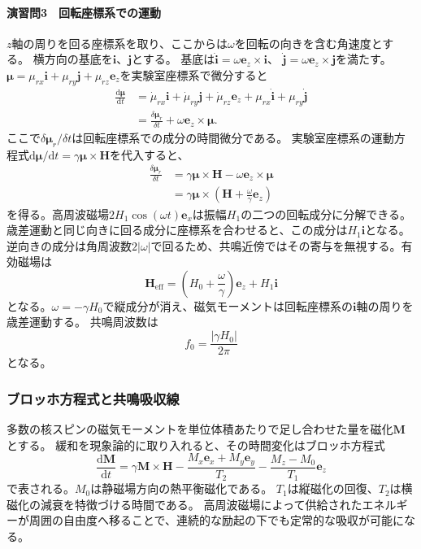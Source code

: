 \documentclass[dvipdfmx,a4paper,11pt]{jsarticle}
\begin{document}
\paragraph{演習問3　回転座標系での運動}
$z$軸の周りを回る座標系を取り、ここからは$\omega$を回転の向きを含む角速度とする。
横方向の基底を$\boldsymbol{i}$、$\boldsymbol{j}$とする。
基底は$\dot{\boldsymbol{i}}=\omega\boldsymbol{e}_z\times\boldsymbol{i}$、
$\dot{\boldsymbol{j}}=\omega\boldsymbol{e}_z\times\boldsymbol{j}$を満たす。
$\boldsymbol{\mu}=\mu_{rx}\boldsymbol{i}+\mu_{ry}\boldsymbol{j}+\mu_{rz}\boldsymbol{e}_z$を実験室座標系で微分すると
\begin{align}
 \frac{\mathrm{d}\boldsymbol{\mu}}{\mathrm{d}t}
 &=\dot{\mu}_{rx}\boldsymbol{i}+\dot{\mu}_{ry}\boldsymbol{j}
   +\dot{\mu}_{rz}\boldsymbol{e}_z
   +\mu_{rx}\dot{\boldsymbol{i}}+\mu_{ry}\dot{\boldsymbol{j}}\\
 &=\frac{\delta\boldsymbol{\mu}_r}{\delta t}
   +\omega\boldsymbol{e}_z\times\boldsymbol{\mu}.
\end{align}
ここで$\delta\boldsymbol{\mu}_r/\delta t$は回転座標系での成分の時間微分である。
実験室座標系の運動方程式$\mathrm{d}\boldsymbol{\mu}/\mathrm{d}t
=\gamma\boldsymbol{\mu}\times\boldsymbol{H}$を代入すると、
\begin{align}
 \frac{\delta\boldsymbol{\mu}_r}{\delta t}
 &=\gamma\boldsymbol{\mu}\times\boldsymbol{H}
   -\omega\boldsymbol{e}_z\times\boldsymbol{\mu}\\
 &=\gamma\boldsymbol{\mu}\times
    \left(\boldsymbol{H}+\frac{\omega}{\gamma}\boldsymbol{e}_z\right)
\end{align}
を得る。高周波磁場$2H_1\cos(\omega t)\boldsymbol{e}_x$は振幅$H_1$の二つの回転成分に分解できる。
歳差運動と同じ向きに回る成分に座標系を合わせると、この成分は$H_1\boldsymbol{i}$となる。
逆向きの成分は角周波数$2|\omega|$で回るため、共鳴近傍ではその寄与を無視する。有効磁場は
\begin{equation}
 \boldsymbol{H}_{\mathrm{eff}}
 =\left(H_0+\frac{\omega}{\gamma}\right)\boldsymbol{e}_z
   +H_1\boldsymbol{i}
\end{equation}
となる。$\omega=-\gamma H_0$で縦成分が消え、磁気モーメントは回転座標系の$\boldsymbol{i}$軸の周りを歳差運動する。
共鳴周波数は
\begin{equation}
  f_0=\frac{|\gamma H_0|}{2\pi}
  \label{eq:resonance}
\end{equation}
となる。

\subsubsection{ブロッホ方程式と共鳴吸収線}
多数の核スピンの磁気モーメントを単位体積あたりで足し合わせた量を磁化$\boldsymbol{M}$とする。
緩和を現象論的に取り入れると、その時間変化はブロッホ方程式
\begin{equation}
 \frac{\mathrm{d}\boldsymbol{M}}{\mathrm{d}t}
 =\gamma\boldsymbol{M}\times\boldsymbol{H}
 -\frac{M_x\boldsymbol{e}_x+M_y\boldsymbol{e}_y}{T_2}
 -\frac{M_z-M_0}{T_1}\boldsymbol{e}_z
\end{equation}
で表される。$M_0$は静磁場方向の熱平衡磁化である。
$T_1$は縦磁化の回復、$T_2$は横磁化の減衰を特徴づける時間である。
高周波磁場によって供給されたエネルギーが周囲の自由度へ移ることで、連続的な励起の下でも定常的な吸収が可能になる。
\end{document}
